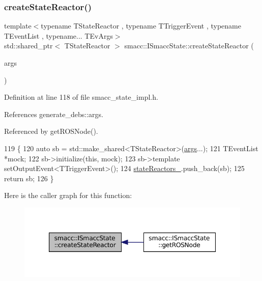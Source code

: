 \subsubsection{\texorpdfstring{create\+State\+Reactor()}{createStateReactor()}\hspace{0.1cm}{\footnotesize\ttfamily [1/2]}}
{\footnotesize\ttfamily template$<$typename T\+State\+Reactor , typename T\+Trigger\+Event , typename T\+Event\+List , typename... T\+Ev\+Args$>$ \\
std\+::shared\+\_\+ptr$<$ T\+State\+Reactor $>$ smacc\+::\+I\+Smacc\+State\+::create\+State\+Reactor (\begin{DoxyParamCaption}\item[{T\+Ev\+Args...}]{args }\end{DoxyParamCaption})}



Definition at line 118 of file smacc\+\_\+state\+\_\+impl.\+h.



References generate\+\_\+debs\+::args.



Referenced by get\+R\+O\+S\+Node().


\begin{DoxyCode}
119 \{
120     \textcolor{keyword}{auto} sb = std::make\_shared<TStateReactor>(\hyperlink{namespacegenerate__debs_a75f9143e38df82d83b2e8a6f99cae02c}{args}...);
121     TEventList *mock;
122     sb->initialize(\textcolor{keyword}{this}, mock);
123     sb->template setOutputEvent<TTriggerEvent>();
124     \hyperlink{classsmacc_1_1ISmaccState_a7410a353b515f7b7357e94ef619a6c45}{stateReactors\_}.push\_back(sb);
125     \textcolor{keywordflow}{return} sb;
126 \}
\end{DoxyCode}
Here is the caller graph for this function\+:
\nopagebreak
\begin{figure}[H]
\begin{center}
\leavevmode
\includegraphics[width=347pt]{classsmacc_1_1ISmaccState_a5b071f3034e2a0416d87ff26332f598f_icgraph}
\end{center}
\end{figure}
\mbox{\label{classsmacc_1_1ISmaccState_a92bba7b456f026467f23c3cd6ceb5985}} 
